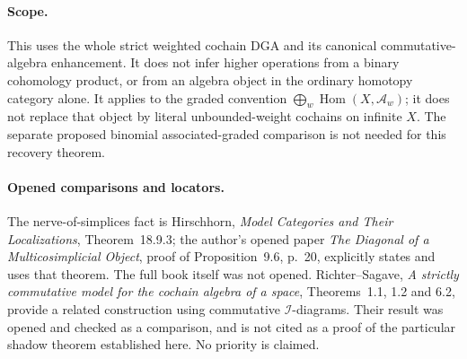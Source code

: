 \paragraph{Scope.}
This uses the whole strict weighted cochain DGA and its canonical
commutative-algebra enhancement. It does not infer higher operations
from a binary cohomology product, or from an algebra object in the
ordinary homotopy category alone. It applies to the graded convention
$\bigoplus_w\operatorname{Hom}(X,\mathcal A_w)$; it does not replace
that object by literal unbounded-weight cochains on infinite $X$.
The separate proposed binomial associated-graded comparison is not
needed for this recovery theorem.

\paragraph{Opened comparisons and locators.}
The nerve-of-simplices fact is Hirschhorn, \emph{Model Categories and
Their Localizations}, Theorem~18.9.3; the author's opened paper
\emph{The Diagonal of a Multicosimplicial Object}, proof of
Proposition~9.6, p.~20, explicitly states and uses that theorem.
The full book itself was not opened. Richter--Sagave,
\emph{A strictly commutative model for the cochain algebra of a
space}, Theorems~1.1, 1.2 and 6.2, provide a related construction
using commutative $\mathcal I$-diagrams. Their result was opened and
checked as a comparison, and is not cited as a proof of the
particular shadow theorem established here. No priority is claimed.
